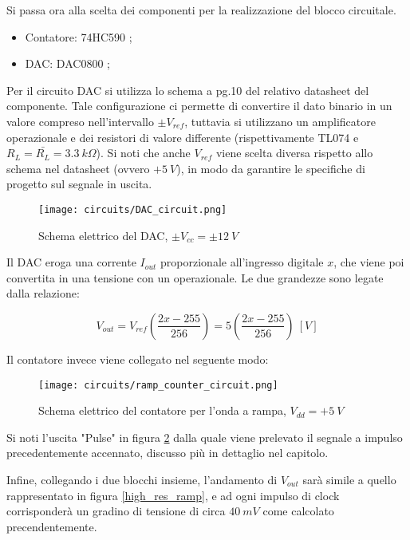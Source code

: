 
Si passa ora alla scelta dei componenti per la realizzazione del blocco circuitale.

\begin{itemize}
    \item Contatore: 74HC590 \cite{74hc590};
    \item DAC: DAC0800 \cite{dac0800};
\end{itemize}

Per il circuito DAC si utilizza lo schema a pg.10 del relativo datasheet del componente.
Tale configurazione ci permette di convertire il dato binario in un valore compreso
nell'intervallo $\pm V_{ref}$, tuttavia si utilizzano un amplificatore operazionale e dei
resistori di valore differente (rispettivamente TL074 \cite{tl074} e $R_L=\bar{R_L}=3.3\ k\Omega$).
Si noti che anche $V_{ref}$ viene scelta diversa rispetto allo schema nel datasheet
(ovvero $+5\ V$), in modo da garantire le specifiche di progetto sul segnale in uscita.

\begin{figure}[H]
    \centering
    \texttt{[image: circuits/DAC\_circuit.png]}
    \caption{Schema elettrico del DAC, $\pm V_{cc}=\pm 12\ V$}
    \label{DAC_circuit}
\end{figure}

Il DAC eroga una corrente $I_{out}$ proporzionale all'ingresso digitale $x$, che viene poi
convertita in una tensione con un operazionale. Le due grandezze sono legate dalla relazione:

\begin{displaymath}
    V_{out}=V_{ref}\left(\frac{2x-255}{256}\right)=5\left(\frac{2x-255}{256}\right)\ [V]
\end{displaymath}

Il contatore invece viene collegato nel seguente modo:

\begin{figure}[H]
    \centering
    \texttt{[image: circuits/ramp\_counter\_circuit.png]}
    \caption{Schema elettrico del contatore per l'onda a rampa, $V_{dd}=+5\ V$}
    \label{ramp_counter_circuit}
\end{figure}

Si noti l'uscita "Pulse" in figura \ref{ramp_counter_circuit} dalla quale viene prelevato
il segnale a impulso precedentemente accennato, discusso più in dettaglio nel capitolo.

Infine, collegando i due blocchi insieme, l'andamento di $V_{out}$ sarà simile a quello
rappresentato in figura \ref{high_res_ramp}, e ad ogni impulso di clock corrisponderà un
gradino di tensione di circa $40\ mV$ come calcolato precendentemente.

